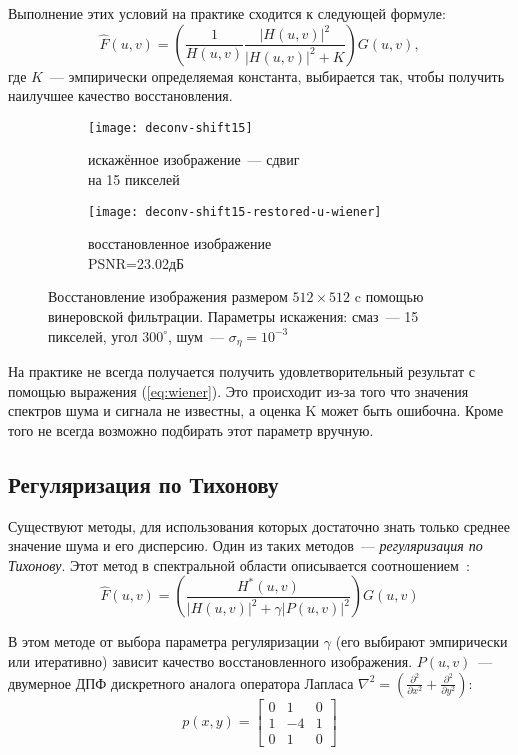 Выполнение этих условий на практике сходится к следующей формуле:
\begin{equation}\label{eq:wiener}
\hat{F}(u,v)=\left(\frac{1}{H(u,v)}\frac{|H(u,v)|^2}{|H(u,v)|^2+K}\right)G(u,v),
\end{equation}
где $K$~--- эмпирически определяемая константа, выбирается так, чтобы получить наилучшее качество восстановления.

\begin{figure}[h!]
	\begin{subfigure}[b]{0.5\textwidth}
		\texttt{[image: deconv-shift15]}
		\caption{искажённое изображение~--- сдвиг \\на 15 пикселей}
		\label{fig:astroShift15u}
	\end{subfigure}%
	\begin{subfigure}[b]{0.5\textwidth}
		\texttt{[image: deconv-shift15-restored-u-wiener]}
		\caption{восстановленное изображение\\ PSNR=23.02дБ}
		\label{fig:astroWienerRestored}
	\end{subfigure}%
	\caption{Восстановление изображения размером $512\times 512$ c помощью винеровской фильтрации. Параметры искажения: смаз~--- 15 пикселей, угол $300^\circ$, шум~--- $\sigma_\eta=10^{-3}$}
\end{figure}

На практике не всегда получается получить удовлетворительный результат с помощью выражения (\ref{eq:wiener}). Это происходит из-за того что значения спектров шума и сигнала не известны, а оценка K может быть ошибочна. Кроме того не всегда возможно подбирать этот параметр вручную.

\subsection{Регуляризация по Тихонову}
Существуют методы, для использования которых достаточно знать только среднее значение шума и его дисперсию. Один из таких методов~--- \textit{регуляризация по Тихонову}. Этот метод в спектральной области описывается соотношением~\cite[стр.~418]{gonsalesDigital2012}:
\begin{equation}\label{eq:tikhonov}
\hat{F}(u,v) = \left(\frac{H^*(u,v)}{|H(u,v)|^2 + \gamma|P(u,v)|^2}\right)G(u,v)
\end{equation}

В этом методе от выбора параметра регуляризации $\gamma$ (его выбирают эмпирически или итеративно) зависит качество восстановленного изображения. $P(u,v)$~--- двумерное ДПФ дискретного аналога оператора Лапласа $\nabla^2 = \left(\frac{\partial^2}{\partial x^2} + \frac{\partial^2}{\partial y^2}\right)$:
\begin{equation}
p(x,y) = \begin{bmatrix}
		0 & 1 & 0\\
		1 &-4 & 1\\
		0 & 1 & 0
	\end{bmatrix}
\end{equation}

